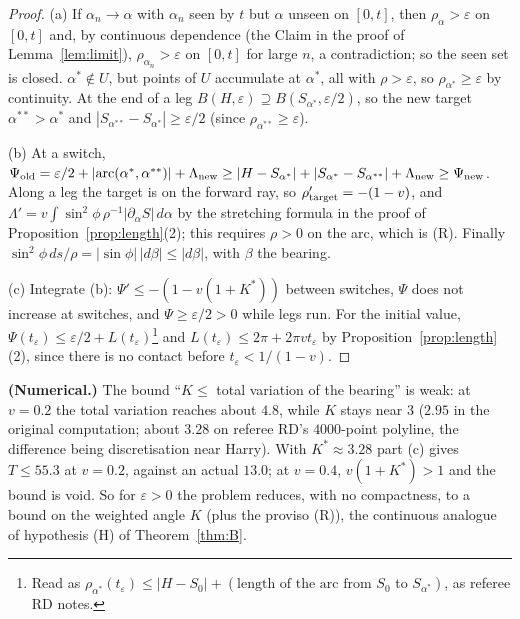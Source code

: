 \begin{proof}
(a) If $\alpha_n\to\alpha$ with $\alpha_n$ seen by $t$ but $\alpha$ unseen on $[0,t]$, then $\rho_\alpha>\varepsilon$ on $[0,t]$
and, by continuous dependence (the Claim in the proof of Lemma~\ref{lem:limit}), $\rho_{\alpha_n}>\varepsilon$ on $[0,t]$ for
large $n$, a contradiction; so the seen set is closed. $\alpha^*\notin U$, but points of $U$ accumulate at $\alpha^*$, all with
$\rho>\varepsilon$, so $\rho_{\alpha^*}\ge\varepsilon$ by continuity. At the end of a leg $B(H,\varepsilon)\supseteq
B(S_{\alpha^*},\varepsilon/2)$, so the new target $\alpha^{**}>\alpha^*$ and $|S_{\alpha^{**}}-S_{\alpha^*}|\ge\varepsilon/2$
(since $\rho_{\alpha^{**}}\ge\varepsilon$).

(b) At a switch,
$\Psi_{\rm old}=\varepsilon/2+|\mathrm{arc}(\alpha^*,\alpha^{**})|+\Lambda_{\rm new}\ge|H-S_{\alpha^*}|+|S_{\alpha^*}-S_{\alpha^{**}}|
+\Lambda_{\rm new}\ge\Psi_{\rm new}$. Along a leg the target is on the forward ray, so $\rho_{\rm target}'=-(1-v)$, and
$\Lambda'=v\int\sin^2\phi\,\rho^{-1}|\partial_\alpha S|\,d\alpha$ by the stretching formula in the proof of
Proposition~\ref{prop:length}(2); this requires $\rho>0$ on the arc, which is (R). Finally $\sin^2\phi\,ds/\rho=|\sin\phi|\,|d\beta|\le|d\beta|$,
with $\beta$ the bearing.

(c) Integrate (b): $\Psi'\le-(1-v(1+K^*))$ between switches, $\Psi$ does not increase at switches, and $\Psi\ge\varepsilon/2>0$ while
legs run. For the initial value, $\Psi(t_\varepsilon)\le\varepsilon/2+L(t_\varepsilon)$\footnote{Read as
$\rho_{\alpha^*}(t_\varepsilon)\le|H-S_0|+(\text{length of the arc from }S_0\text{ to }S_{\alpha^*})$, as referee RD notes.}
and $L(t_\varepsilon)\le2\pi+2\pi vt_\varepsilon$ by Proposition~\ref{prop:length}(2), since there is no contact before
$t_\varepsilon<1/(1-v)$.
\end{proof}

\begin{remark}
\textbf{(Numerical.)} The bound ``$K\le$ total variation of the bearing'' is weak: at $v=0.2$ the total variation reaches about
$4.8$, while $K$ stays near $3$ ($2.95$ in the original computation; about $3.28$ on referee RD's $4000$-point polyline, the
difference being discretisation near Harry). With $K^*\approx3.28$ part (c) gives $T\le55.3$ at $v=0.2$, against an actual
$13.0$; at $v=0.4$, $v(1+K^*)>1$ and the bound is void. So for $\varepsilon>0$ the problem reduces, with no compactness, to a
bound on the weighted angle $K$ (plus the proviso (R)), the continuous analogue of hypothesis (H) of Theorem~\ref{thm:B}.
\end{remark}
